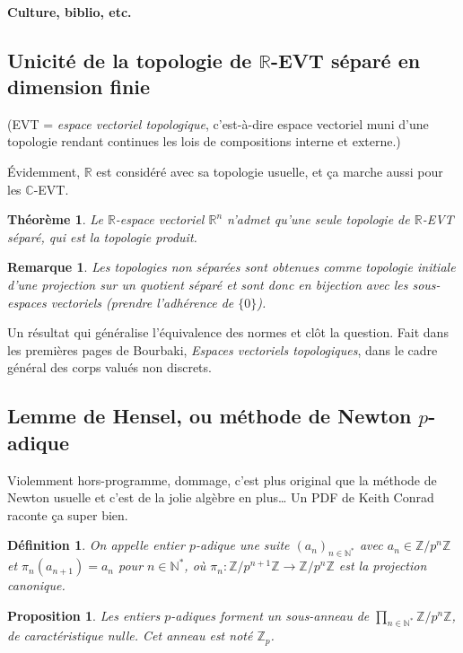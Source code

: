 \documentclass[a4paper, 11pt]{article}
\def\Z{\mathbb{Z}}
\def\N{\mathbb{N}}
\def\R{\mathbb{R}}
\def\C{\mathbb{C}}
\newtheorem*{definition}{Définition}
\newtheorem*{proposition}{Proposition}
\newtheorem*{theorem}{Théorème}
\newtheorem*{remark}{Remarque}
\begin{document}
\paragraph{Culture, biblio, etc.}

\newpage

\subsection{Unicité de la topologie de $\R$-EVT séparé en dimension finie}

(EVT = \emph{espace vectoriel topologique}, c'est-à-dire espace vectoriel muni
d'une topologie rendant continues les lois de compositions interne et externe.)

Évidemment, $\R$ est considéré avec sa topologie usuelle, et ça marche aussi
pour les $\C$-EVT.

\begin{theorem}
  Le $\R$-espace vectoriel $\R^n$ n'admet qu'une seule topologie de $\R$-EVT
  séparé, qui est la topologie produit.
\end{theorem}

\begin{remark}
  Les topologies non séparées sont obtenues comme topologie initiale d'une
  projection sur un quotient séparé et sont donc en bijection avec les
  sous-espaces vectoriels (prendre l'adhérence de $\{0\}$).
\end{remark}

Un résultat qui généralise l'équivalence des normes et clôt la question. Fait
dans les premières pages de Bourbaki, \emph{Espaces vectoriels topologiques},
dans le cadre général des corps valués non discrets.

\subsection{Lemme de Hensel, ou méthode de Newton $p$-adique}

Violemment hors-programme, dommage, c'est plus original que la méthode de Newton
usuelle et c'est de la jolie algèbre en plus… Un PDF de Keith Conrad raconte ça
super bien.

\begin{definition}
  On appelle \emph{entier $p$-adique} une suite $(a_n)_{n \in \N^*}$
  avec $a_n \in \Z/p^n\Z$ et $\pi_n(a_{n+1}) = a_n$ pour $n \in \N^*$,
  où $\pi_n : \Z/p^{n+1}\Z \to \Z/p^n\Z$ est la projection canonique.
\end{definition}
\begin{proposition}
  Les entiers $p$-adiques forment un sous-anneau de
  $\prod_{n \in \N^*} \Z/p^n\Z$, de caractéristique nulle. Cet anneau
  est noté $\Z_p$.
\end{proposition}
\end{document}
